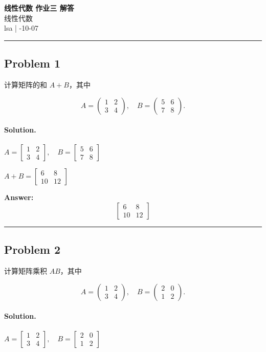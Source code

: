 \documentclass[12pt, a4paper]{ctexart}
\newcommand{\problem}[1]{\subsection*{Problem #1}}
\newcommand{\solution}{\paragraph{Solution.}}
\begin{document}
\begin{center}
    {\LARGE\bfseries 线性代数 作业三 解答} \\[0.5em]
    {\large 线性代数} \\[0.3em]
    lsa \quad | -10-07
\end{center}

\hrule
\vspace{1em}
\problem{1}

计算矩阵的和 $A + B$，其中

$$A = \begin{pmatrix} 1 & 2 \\ 3 & 4 \end{pmatrix}, \quad B = \begin{pmatrix} 5 & 6 \\ 7 & 8 \end{pmatrix}.$$

\solution

$A = \left[\begin{matrix}1 & 2\\3 & 4\end{matrix}\right],\quad B = \left[\begin{matrix}5 & 6\\7 & 8\end{matrix}\right]$

$A + B = \left[\begin{matrix}6 & 8\\10 & 12\end{matrix}\right]$

\textbf{Answer:}
\[\boxed{\left[\begin{matrix}6 & 8\\10 & 12\end{matrix}\right]}\]

\vspace{1em}
\hrule
\vspace{1em}

\problem{2}

计算矩阵乘积 $AB$，其中

$$A = \begin{pmatrix} 1 & 2 \\ 3 & 4 \end{pmatrix}, \quad B = \begin{pmatrix} 2 & 0 \\ 1 & 2 \end{pmatrix}.$$

\solution

$A = \left[\begin{matrix}1 & 2\\3 & 4\end{matrix}\right],\quad B = \left[\begin{matrix}2 & 0\\1 & 2\end{matrix}\right]$
\end{document}
